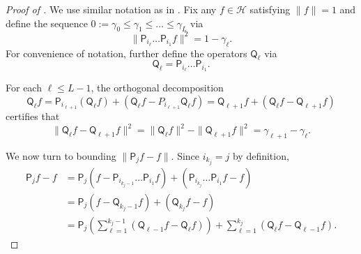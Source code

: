 \documentclass[11pt]{article}
\begin{document}
\begin{proof}[Proof of ]
We use similar notation as in . Fix any $f\in \mathcal{H}$ satisfying $\|f\|=1$ and define the sequence $0:=\gamma_0\leq \gamma_1\leq\ldots\leq \gamma_L$ via
\begin{equation*}
    \|\mathsf{P}_{i_{\ell}}\ldots \mathsf{P}_{i_1}f\|^2=1-\gamma_{\ell}.
\end{equation*}
For convenience of notation, further define the operators $\mathsf{Q}_{\ell}$ via 
\begin{equation*}
    \mathsf{Q}_{\ell} = \mathsf{P}_{i_{\ell}}\ldots \mathsf{P}_{i_1}.
\end{equation*}

For each $\ell\leq L-1$, the orthogonal decomposition
    \begin{equation*}
        \mathsf{Q}_{{\ell}}f = \mathsf{P}_{i_{\ell+1}}( \mathsf{Q}_{{\ell}}f)+(\mathsf{Q}_{{\ell}}f-P_{i_{\ell+1}}\mathsf{Q}_{{\ell}} f)= \mathsf{Q}_{{\ell+1}}f+(\mathsf{Q}_{{\ell}}f-\mathsf{Q}_{{\ell+1}} f)
    \end{equation*}
    certifies that
    \begin{equation}
    \label{eq:telescope}
        \|\mathsf{Q}_{{\ell}}f-\mathsf{Q}_{{\ell+1}} f\|^2=\|\mathsf{Q}_{{\ell}}f\|^2-\|\mathsf{Q}_{{\ell+1}}f\|^2=\gamma_{\ell+1}-\gamma_{\ell}.
    \end{equation}

    We now turn to bounding $\|\mathsf{P}_j f-f\|$. Since $i_{k_j}=j$ by definition,
    \begin{align*}
        \mathsf{P}_j f-f &= \mathsf{P}_{j}(f-\mathsf{P}_{i_{k_{j}-1}}\ldots \mathsf{P}_{i_1} f) + (\mathsf{P}_{i_{k_j}}\ldots \mathsf{P}_{i_1}f -f)\\
        &= \mathsf{P}_{j}(f-\mathsf{Q}_{{k_{j}-1}} f) + (\mathsf{Q}_{{k_j}}f -f)\\
        &=\mathsf{P}_{j}\left(\sum_{\ell=1}^{k_j-1} (\mathsf{Q}_{{\ell-1}} f-\mathsf{Q}_{{\ell}} f)\right)+\sum_{\ell=1}^{k_j} (\mathsf{Q}_{{\ell}} f -  \mathsf{Q}_{{\ell-1}} f).
    \end{align*}


\end{proof}
\end{document}
